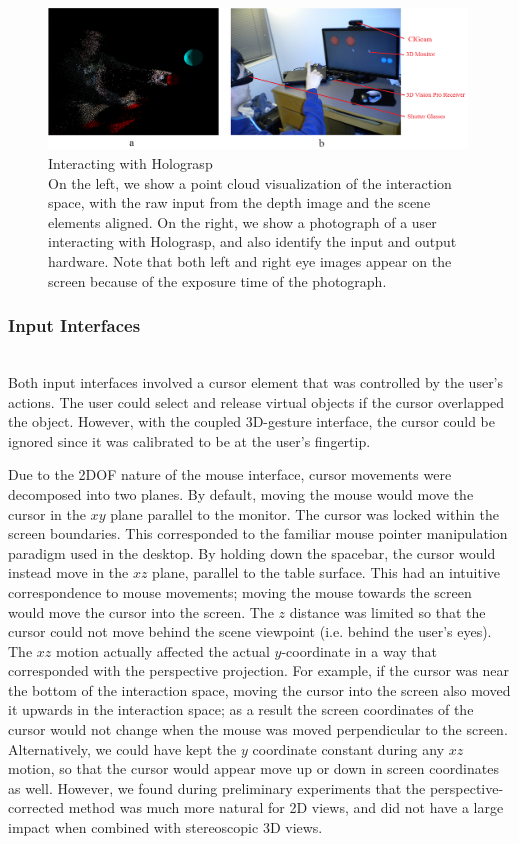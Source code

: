 \documentclass[pageno]{jpaper}
\begin{document}
\begin{figure}[H]
\centering
\includegraphics[width=0.99\textwidth]{figures/pointcloud.png}
\caption{Interacting with Holograsp\\
On the left, we show a point cloud visualization of the interaction space, with the raw input from the depth image and the scene elements aligned.
On the right, we show a photograph of a user interacting with Holograsp, and also identify the input and output hardware. Note that both left
and right eye images appear on the screen because of the exposure time of the photograph.}
\label{fig:user}
\end{figure}

\subsubsection{Input Interfaces}$ $\\
Both input interfaces involved a cursor element that was controlled by the user's actions. The user
could select and release virtual objects if the cursor overlapped the object.
However, with the coupled 3D-gesture interface, the cursor could be ignored since it was
calibrated to be at the user's fingertip.

Due to the 2DOF nature of the mouse interface, cursor movements were decomposed into two planes.
By default, moving the mouse would move the cursor in the $xy$ plane parallel to the monitor.
The cursor was locked within the screen boundaries. This corresponded to the familiar mouse pointer
manipulation paradigm used in the desktop. By holding down the spacebar, the cursor would instead move in the
$xz$ plane, parallel to the table surface. This had an intuitive correspondence to mouse movements; moving
the mouse towards the screen would move the cursor into the screen. The $z$ distance was limited so that the
cursor could not move behind the scene viewpoint (i.e. behind the user's eyes). The $xz$ motion actually affected the actual $y$-coordinate
in a way that corresponded with the perspective projection. For example, if the cursor was near the bottom of the interaction
space, moving the cursor into the screen also moved it upwards in the interaction space; as a result the screen
coordinates of the cursor would not change when the mouse was moved perpendicular to the screen. Alternatively, we could have kept the $y$ coordinate
constant during any $xz$ motion, so that the cursor would appear move up or down in screen coordinates as well. However,
we found during preliminary experiments that the perspective-corrected method was much more natural for 2D views, and did
not have a large impact when combined with stereoscopic 3D views.
\end{document}
